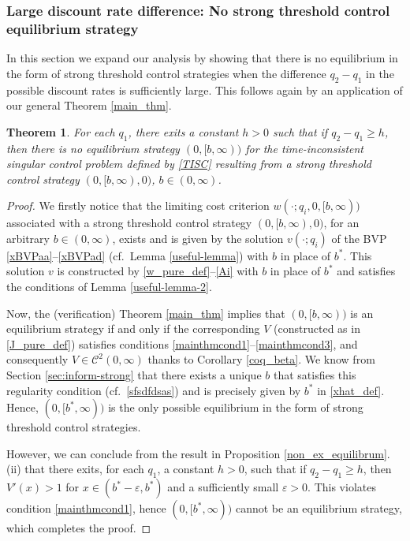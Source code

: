 \documentclass[11pt]{article} %
\newtheorem{theorem}{Theorem}[section]
\numberwithin{komcounter}{section}
\renewcommand{\epsilon}{\varepsilon}
\begin{document}
\subsubsection{Large discount rate difference: No strong threshold control equilibrium strategy} 
\label{sec:Equib2}

In this section we expand our analysis by showing that there is no equilibrium in the form of strong threshold control strategies when the difference $q_2-q_1$ in the possible discount rates is sufficiently large. This follows again by an application of our general Theorem \ref{main_thm}.

\begin{theorem}\label{thm:no-pure-NE} 
For each $q_1$, there exits a constant $h>0$ such that if 
$q_2-q_1\geq h$, then there is no equilibrium strategy $(0,[b,\infty))$ for the time-inconsistent singular control problem defined by \eqref{TISC} resulting from a strong threshold control strategy $(0,[b,\infty),0)$, $b \in (0,\infty)$. 
\end{theorem} 
\begin{proof}
We firstly notice that the limiting cost criterion $w(\cdot;q_i,0,[b,\infty))$ associated with a strong threshold control strategy $(0,[b,\infty),0)$, for an arbitrary $b \in (0,\infty)$, exists and is given by the solution $v(\cdot;q_i)$ of the BVP \eqref{xBVPaa}--\eqref{xBVPad} (cf.~Lemma \ref{useful-lemma}) with $b$ in place of $b^*$. 
This solution $v$ is constructed by \eqref{w_pure_def}--\eqref{Ai} with $b$ in place of $b^*$ and satisfies the conditions of Lemma \ref{useful-lemma-2}.

Now, the (verification) Theorem \ref{main_thm} implies that $(0,[b,\infty))$ is an equilibrium strategy if and only if the corresponding $V$ (constructed as in \eqref{J_pure_def}) satisfies conditions \eqref{mainthmcond1}--\eqref{mainthmcond3}, and consequently $V\in \mathcal{C}^2(0,\infty)$ thanks to Corollary \ref{coq_beta}. 
We know from Section \ref{sec:inform-strong} that there exists a unique $b$ that satisfies this regularity condition (cf.~\eqref{sfsdfdsas}) and is precisely given by $b^*$ in \eqref{xhat_def}. 
Hence, $(0,[b^*,\infty))$ is the only possible equilibrium in the form of strong threshold control strategies.  

However, we can conclude from the result in Proposition \ref{non_ex_equilibrum}.(ii) that there exits, for each $q_1$,  a constant $h>0$, such that if 
$q_2-q_1 \geq h$, then $V'(x)>1$ for $x\in (b^*-\epsilon, b^*)$ and a sufficiently small $\epsilon>0$. This violates condition \eqref{mainthmcond1}, hence $(0,[b^*,\infty))$ cannot be an equilibrium strategy, which completes the proof.
\end{proof}
\end{document}
